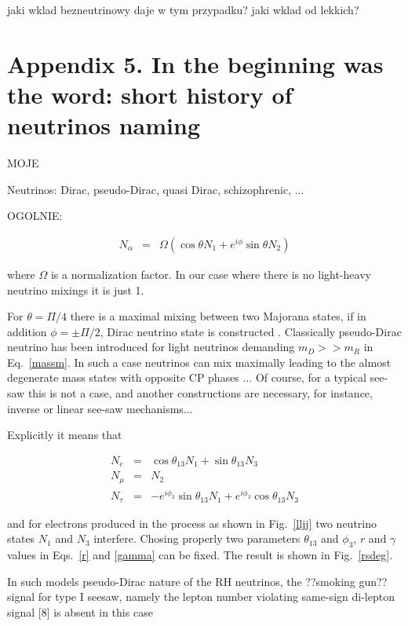 \documentclass[twocolumn,superscriptaddress,showpacs,prl,nofootinbib,floatfix]{revtex4}
\begin{document}
jaki wklad bezneutrinowy daje w tym przypadku? jaki wklad od lekkich?



\section{Appendix 5. In the beginning was the word: short history of neutrinos naming  \label{apphis}} 

MOJE

  Neutrinos: Dirac, pseudo-Dirac, quasi Dirac, schizophrenic, ... 
 
OGOLNIE: 
 
\begin{eqnarray}
N_\alpha &=& \Omega (\cos\theta N_1 +e^{i \phi} \sin\theta N_2 )  
\end{eqnarray} 

where $\Omega$ is a normalization factor. In our case where there is no light-heavy neutrino mixings  it is just 1.  
 
For $\theta = \Pi/4$ there is a maximal mixing between two Majorana states, if in addition $\phi = \pm \Pi/2$, Dirac neutrino state is constructed  \cite{Bilenky:1987ty}. Classically pseudo-Dirac neutrino has been introduced for light neutrinos demanding $m_D>> m_R$ in Eq.~\ref{massm}. In such a case neutrinos can mix maximally leading to the almost degenerate mass states  with opposite CP phases ...
Of course, for a typical see-saw this is not a case, and  another constructions are necessary, for instance, inverse or linear see-saw mechanisms...

Explicitly it means that

\begin{eqnarray}
N_e &=& \cos\theta_{13} N_1 +\sin\theta_{13} N_3 \\
N_\mu &=& N_2 \\
N_\tau &=& -e^{i\phi_3}\sin\theta_{13} N_1 +e^{i\phi_3}\cos\theta_{13} N_3
\end{eqnarray}

and for electrons produced in the process as shown in Fig.~\ref{lljj} two neutrino states $N_1$ and $N_3$ interfere. Chosing properly two parameters $\theta_{13}$ and $\phi_3$, $r$ and 
$\gamma$ values in Eqs.~\ref{r} and \ref{gamma} can be fixed. The result is shown in Fig.~\ref{rsdeg}.
 
In such models 
pseudo-Dirac nature of the RH
neutrinos, the ??smoking gun?? signal for type I seesaw, namely the lepton number violating
same-sign di-lepton signal [8] is absent in this case
\end{document}
